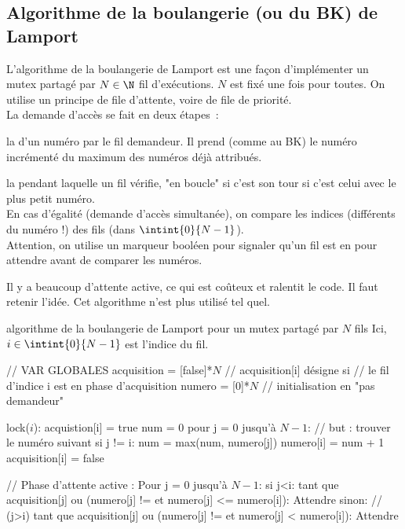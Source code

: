 \begin{adjustwidth}{-3cm}{-3cm}
\subsection{Algorithme de la boulangerie (ou du BK) de Lamport}

L'algorithme de la boulangerie de Lamport est une façon d'implémenter un mutex partagé par $N\in \N$ fil d'exécutions. $N$ est fixé une fois pour toutes.
On utilise un principe de file d'attente, voire de file de priorité.\\
La demande d'accès se fait en deux étapes~:
\begin{enumeratebf}
    \item la  d'un numéro par le fil demandeur. Il prend (comme au BK) le numéro incrémenté du maximum des numéros déjà attribués.
    \item la  pendant laquelle un fil vérifie, "en boucle" si c'est son tour \ie si c'est celui avec le plus petit numéro.\\
    En cas d'égalité (demande d'accès simultanée), on compare les indices (différents du numéro !) des fils (dans $\intint{0}{N-1}$).\\
    Attention, on utilise un marqueur booléen pour signaler qu'un fil est en  pour attendre avant de comparer les numéros.
\end{enumeratebf}

\begin{remarque}{}{}
    Il y a beaucoup d'attente active, ce qui est coûteux et ralentit le code. Il faut retenir l'idée. Cet algorithme n'est plus utilisé tel quel.
\end{remarque}

\begin{implementation}{algorithme de la boulangerie de Lamport pour un mutex partagé par $N$ fils}
    Ici, $i \in \intint{0}{N-1}$ est l'indice du fil.
    \begin{lstLNat}
    // VAR GLOBALES
    acquisition = [false]*$N$ // acquisition[i] désigne si 
    // le fil d'indice i est en phase d'acquisition
    numero = [0]*$N$ // initialisation en "pas demandeur"

    lock($i$):
        acquistion[i] = true
        num = 0
        pour j = 0 jusqu'à $N-1$: // but : trouver le numéro suivant
            si j != i:
                num = max(num, numero[j])
        numero[i] = num + 1
        acquisition[i] = false

        // Phase d'attente active :
        Pour j = 0 jusqu'à $N-1$:
            si j<i:
                tant que acquisition[j] ou (numero[j] != et numero[j] <= numero[i]):
                    Attendre
            sinon: // (j>i)
                tant que acquisition[j] ou (numero[j] != et numero[j] < numero[i]):
                    Attendre
    

\end{lstLNat}
\end{implementation}
\end{adjustwidth}
